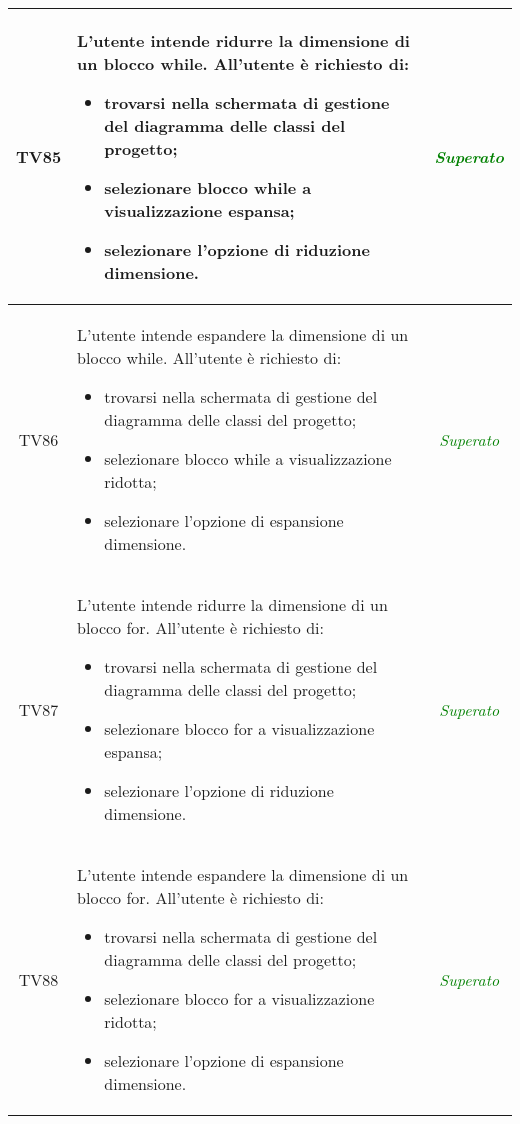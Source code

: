 \begin{longtable}{|c|>{}m{8cm}|c|}
\hypertarget{TV4.15}{TV85} & L'utente intende ridurre la dimensione di un blocco while.
All'utente è richiesto di:
\begin{itemize}
	\item trovarsi nella schermata di gestione del diagramma delle classi del progetto;
	\item selezionare blocco while a visualizzazione espansa;
	\item selezionare l'opzione di riduzione dimensione.
\end{itemize} & \textcolor{Green}{\textit{Superato}}\\ \hline

\hypertarget{TV4.16}{TV86} & L'utente intende espandere la dimensione di un blocco while.
All'utente è richiesto di:
\begin{itemize}
	\item trovarsi nella schermata di gestione del diagramma delle classi del progetto;
	\item selezionare blocco while a visualizzazione ridotta;
	\item selezionare l'opzione di espansione dimensione.
\end{itemize} & \textcolor{Green}{\textit{Superato}}\\ \hline

\hypertarget{TV4.17}{TV87} & L'utente intende ridurre la dimensione di un blocco for.
All'utente è richiesto di:
\begin{itemize}
	\item trovarsi nella schermata di gestione del diagramma delle classi del progetto;
	\item selezionare blocco for a visualizzazione espansa;
	\item selezionare l'opzione di riduzione dimensione.
\end{itemize} & \textcolor{Green}{\textit{Superato}}\\ \hline

\hypertarget{TV4.18}{TV88} & L'utente intende espandere la dimensione di un blocco for.
All'utente è richiesto di:
\begin{itemize}
	\item trovarsi nella schermata di gestione del diagramma delle classi del progetto;
	\item selezionare blocco for a visualizzazione ridotta;
	\item selezionare l'opzione di espansione dimensione.
\end{itemize} & \textcolor{Green}{\textit{Superato}}\\ \hline


\end{longtable}
